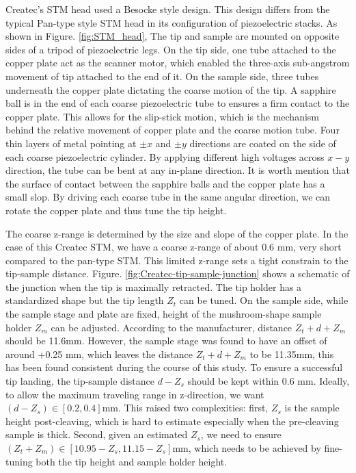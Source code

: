 Createc's STM head used a Besocke style design\cite{besockeEasilyOperableScanning1987b}. This design differs from the typical Pan-type style STM head in its configuration of piezoelectric stacks. As shown in Figure. \ref{fig:STM_head}, The tip and sample are mounted on opposite sides of a tripod of piezoelectric legs. On the tip side, one tube attached to the copper plate act as the scanner motor, which enabled the three-axis sub-angstrom movement of tip attached to the end of it. On the sample side, three tubes underneath the copper plate dictating the coarse motion of the tip. A sapphire ball is in the end of each coarse piezoelectric tube to ensures a firm contact to the copper plate. This allows for the slip-stick motion, which is the mechanism behind the relative movement of copper plate and the coarse motion tube. Four thin layers of metal pointing at $\pm x$ and $\pm y$ directions are coated on the side of each coarse piezoelectric cylinder. By applying different high voltages across $x-y$ direction, the tube can be bent at any in-plane direction. It is worth mention that the surface of contact between the sapphire balls and the copper plate has a small slop. By driving each coarse tube in the same angular direction, we can rotate the copper plate and thus tune the tip height.

The coarse z-range is determined by the size and slope of the copper plate. In the case of this Createc \ac{STM}, we have a coarse z-range of about 0.6 mm, very short compared to the pan-type STM. This limited z-range sets a tight constrain to the tip-sample distance. Figure. \ref{fig:Createc-tip-sample-junction} shows a schematic of the junction when the tip is maximally retracted. The tip holder has a standardized shape but the tip length $Z_t$ can be tuned. On the sample side, while the sample stage and plate are fixed, height of the mushroom-shape sample holder $Z_m$ can be adjusted. According to the manufacturer, distance $Z_t + d +Z_m$ should be 11.6mm. However, the sample stage was found to have an offset of around +0.25 mm, which leaves the distance $Z_t + d +Z_m$ to be 11.35mm, this has been found consistent during the course of this study. To ensure a successful tip landing, the tip-sample distance $d-Z_s$ should be kept within 0.6 mm. Ideally, to allow the maximum traveling range in z-direction, we want $(d-Z_s) \in [0.2,0.4]$mm. This raised two complexities: first, $Z_s$ is the sample height post-cleaving, which is hard to estimate especially when the pre-cleaving sample is thick. Second, given an estimated $Z_s$, we need to ensure $(Z_t+Z_m)\in[10.95-Z_s, 11.15-Z_s]$mm, which needs to be achieved by fine-tuning both the tip height and sample holder height.  

